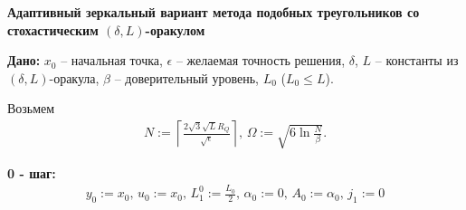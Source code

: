 \documentclass[11pt,a4]{article}
\begin{document}
\begin{mdframed}

\begin{mdframed}
\centering
\bf{Адаптивный зеркальный вариант метода подобных треугольников со стохастическим $(\delta, L)$-оракулом}
\end{mdframed}

\textbf{Дано:} $x_0$ -- начальная точка, $\epsilon$ -- желаемая точность решения, $\delta$, $L$ -- константы из $(\delta, L)$-оракула, $\beta$ -- доверительный уровень, $L_0$ ($L_0 \leq L$).

\iftrue
Возьмем 
\begin{gather*}
N := \left\lceil\frac{2\sqrt{3}\sqrt{L}R_Q}{\sqrt{\epsilon}}\right\rceil, \,
\Omega := \sqrt{6\ln{\frac{N}{\beta}}}.
\end{gather*}

\textbf{0 - шаг:}
\begin{gather*}
y_0 := x_0,\,
u_0 := x_0,\,
L_1^0 := \frac{L_0}{2},\,
\alpha_0 := 0,\,
A_0 := \alpha_0,\,
j_1 := 0
\end{gather*}


\end{mdframed}
\end{document}
